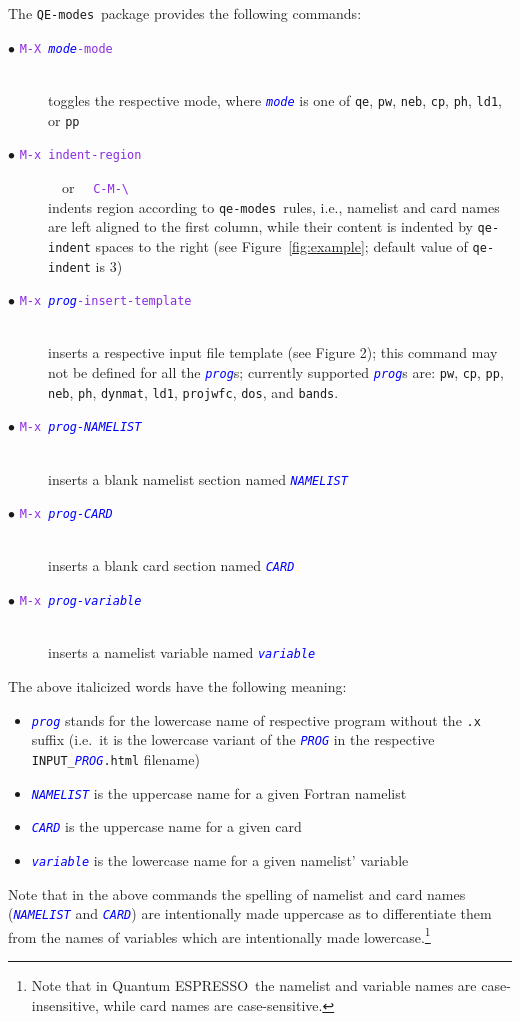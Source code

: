 \documentclass[12pt,a4paper]{article}
\def\qe{{\sc Quantum ESPRESSO}}
\def\QEmodes{\texttt{QE-modes}}
\def\qemodes{\texttt{qe-modes}}
\def\efn#1{\textcolor{BlueViolet}{\texttt{#1}}}
\def\var#1{\textcolor{Blue}{\texttt{\textit{#1}}}}
\begin{document}
The \QEmodes\ package provides the following commands:
\begin{description}
\item[$\bullet$ \efn{M-X \var{mode}-mode}]\hfill\\ toggles
  the respective mode, where \var{mode} is one of \texttt{qe},
  \texttt{pw}, \texttt{neb}, \texttt{cp}, \texttt{ph}, \texttt{ld1}, or \texttt{pp}

\item[$\bullet$ \efn{M-x indent-region}] ~~{\rm or}~~ \efn{C-M-\textbackslash}\hfill\\
  indents region according to \qemodes\ rules, i.e., namelist and card
  names are left aligned to the first column, while their content is
  indented by \texttt{qe-indent} spaces to the right (see
  Figure~\ref{fig:example}; default value of \texttt{qe-indent} is 3)

\item[$\bullet$ \efn{M-x \var{prog}-insert-template}]\hfill\\
  inserts a respective input file template (see Figure 2); this
  command may not be defined for all the \var{prog}s; currently
  supported \var{prog}s are: \texttt{pw}, \texttt{cp}, \texttt{pp},
  \texttt{neb}, \texttt{ph}, \texttt{dynmat}, \texttt{ld1},
  \texttt{projwfc}, \texttt{dos}, and \texttt{bands}.

\item[$\bullet$ \efn{M-x \var{prog-NAMELIST}}]\hfill\\ 
  inserts a blank namelist section named \var{NAMELIST}

\item[$\bullet$ \efn{M-x \var{prog-CARD}}]\hfill\\
  inserts a blank card section named \var{CARD}

\item[$\bullet$ \efn{M-x \var{prog-variable}}]\hfill\\
  inserts a namelist variable named \var{variable}

\end{description}
The above italicized words have the following meaning:
\begin{itemize}
\item \var{prog} stands for the lowercase name of respective program
  without the \texttt{.x} suffix (i.e.\ it is the lowercase variant of
  the \var{PROG} in the respective \texttt{INPUT\_\var{PROG}.html}
  filename)
\item \var{NAMELIST} is the uppercase name for a given Fortran namelist
\item \var{CARD} is the uppercase name for a given card
\item \var{variable} is the lowercase name for a given namelist' variable
\end{itemize}
Note that in the above commands the spelling of namelist and card
names (\var{NAMELIST} and \var{CARD}) are intentionally made uppercase
as to differentiate them from the names of variables which are
intentionally made lowercase.\footnote{Note that in \qe\ the namelist
  and variable names are case-insensitive, while card names are
  case-sensitive.}
\end{document}
